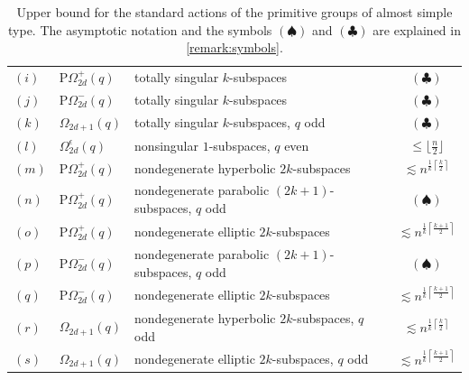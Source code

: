 \documentclass[a4paper]{amsart}
\theoremstyle{definition}
\begin{document}
{\begin{table}[th]
\begin{tabularx}{\textwidth}{l l X c}
        $(i)$ & $\mathrm{P}\Omega_{2d}^+(q)$ & totally singular $k$-subspaces & $(\clubsuit)$ \\

        $(j)$ & $\mathrm{P}\Omega_{2d}^-(q)$ & totally singular $k$-subspaces & $(\clubsuit)$ \\

        $(k)$ & $\Omega_{2d+1}(q)$ & totally singular $k$-subspaces, $q$ odd & $(\clubsuit)$ \\
        
        $(l)$ & $\Omega_{2d}^\epsilon(q)$ & nonsingular $1$-subspaces, $q$ even & $\le \lfloor\frac{n}{2}\rfloor$ \\

        $(m)$ & $\mathrm{P}\Omega_{2d}^+(q)$ & nondegenerate hyperbolic $2k$-subspaces & $\displaystyle \lesssim n^{\frac{1}{k} \left\lceil \frac{k}{2}\right\rceil}$ \\

        $(n)$ & $\mathrm{P}\Omega_{2d}^+(q)$ & \shortstack{nondegenerate parabolic\\$(2k+1)$-subspaces, $q$ odd}  & $(\spadesuit)$ \\

        $(o)$ & $\mathrm{P}\Omega_{2d}^+(q)$ & nondegenerate elliptic $2k$-subspaces & $\displaystyle \lesssim n^{\frac{1}{k} \left\lceil \frac{k+1}{2} \right\rceil}$ \\

        $(p)$ & $\mathrm{P}\Omega_{2d}^-(q)$ & \shortstack{nondegenerate parabolic\\$(2k+1)$-subspaces, $q$ odd} & $(\spadesuit)$ \\

        $(q)$ & $\mathrm{P}\Omega_{2d}^-(q)$ & nondegenerate elliptic $2k$-subspaces & $\displaystyle \lesssim n^{\frac{1}{k} \left\lceil \frac{k+1}{2} \right\rceil}$ \\
        
        $(r)$ & $\Omega_{2d+1}(q)$ & nondegenerate hyperbolic $2k$-subspaces, $q$ odd & $\displaystyle \lesssim n^{\frac{1}{k} \left\lceil \frac{k}{2}\right\rceil}$ \\
        
        $(s)$ & $\Omega_{2d+1}(q)$ & nondegenerate elliptic $2k$-subspaces, $q$ odd & $\displaystyle \lesssim n^{\frac{1}{k} \left\lceil \frac{k+1}{2} \right\rceil}$ \\
        \bottomrule
	\end{tabularx}%
	\caption{Upper bound for the standard actions of the primitive groups of almost simple type. The asymptotic notation and the symbols $(\spadesuit)$ and $(\clubsuit)$ are explained in \cref{remark:symbols}.}%
	\label{table}%
\end{table}%
}
\end{document}
